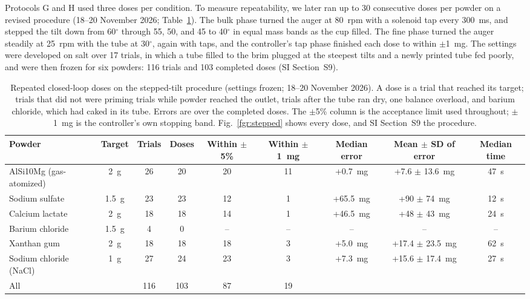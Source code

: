 \documentclass[twoside,twocolumn,9pt]{article}
\begin{document}
Protocols G and H used three doses per condition. To measure repeatability, we later ran up to 30 consecutive doses per powder on a revised procedure (18--20 November 2026; Table~\ref{tbl:stepped}). The bulk phase turned the auger at 80~rpm with a solenoid tap every 300~ms, and stepped the tilt down from 60$^\circ$ through 55, 50, and 45 to 40$^\circ$ in equal mass bands as the cup filled. The fine phase turned the auger steadily at 25~rpm with the tube at 30$^\circ$, again with taps, and the controller's tap phase finished each dose to within $\pm$1~mg. The settings were developed on salt over 17 trials, in which a tube filled to the brim plugged at the steepest tilts and a newly printed tube fed poorly, and were then frozen for six powders: 116 trials and 103 completed doses (SI Section~S9).

\begin{table}[t]
\small
  \caption{\ Repeated closed-loop doses on the stepped-tilt procedure (settings frozen; 18--20 November 2026). A dose is a trial that reached its target; trials that did not were priming trials while powder reached the outlet, trials after the tube ran dry, one balance overload, and barium chloride, which had caked in its tube. Errors are over the completed doses. The $\pm$5\% column is the acceptance limit used throughout; $\pm$1~mg is the controller's own stopping band. Fig.~\ref{fgr:stepped} shows every dose, and SI Section~S9 the procedure.}
  \label{tbl:stepped}
  \begin{tabular*}{\textwidth}{@{\extracolsep{\fill}}lcccccccc}
    \hline
    Powder & Target & Trials & Doses & Within $\pm$5\% & Within $\pm$1~mg & Median error & Mean $\pm$ SD of error & Median time \\
    \hline
    AlSi10Mg (gas-atomized) & 2~g & 26 & 20 & 20 & 11 & +0.7~mg & +7.6 $\pm$ 13.6~mg & 47~s \\
    Sodium sulfate & 1.5~g & 23 & 23 & 12 & 1 & +65.5~mg & +90 $\pm$ 74~mg & 12~s \\
    Calcium lactate & 2~g & 18 & 18 & 14 & 1 & +46.5~mg & +48 $\pm$ 43~mg & 24~s \\
    Barium chloride & 1.5~g & 4 & 0 & -- & -- & -- & -- & -- \\
    Xanthan gum & 2~g & 18 & 18 & 18 & 3 & +5.0~mg & +17.4 $\pm$ 23.5~mg & 62~s \\
    Sodium chloride (NaCl) & 1~g & 27 & 24 & 23 & 3 & +7.3~mg & +15.6 $\pm$ 17.4~mg & 27~s \\
    \hline
    All & & 116 & 103 & 87 & 19 & & & \\
    \hline
  \end{tabular*}
\end{table}
\end{document}
